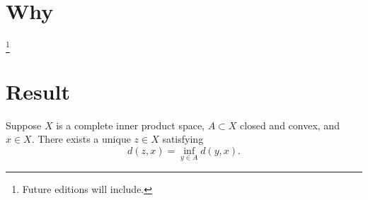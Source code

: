 
\section{Why}
  \ifhmode\unskip\fi\footnote{
Future editions will include.
  }

\section{Result}
\begin{proposition}
Suppose $X$ is a complete inner product space, $A \subset X$ closed and convex, and $x \in X$.
There exists a unique $z \in X$ satisfying
  \[
d(z, x) = \inf_{y \in A} d(y, x).
  \]
\end{proposition}

\blankpage
